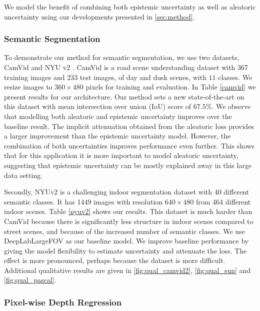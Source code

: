 We model the benefit of combining both epistemic uncertainty as well as aleatoric uncertainty using our developments presented in \cref{sec:method}. 

\subsubsection{Semantic Segmentation}

To demonstrate our method for semantic segmentation, we use two datasets, CamVid \citep{brostow2009semantic} and NYU v2 \citep{silberman2012indoor}. CamVid is a road scene understanding dataset with 367 training images and 233 test images, of day and dusk scenes, with $11$ classes. We resize images to $360\times480$ pixels for training and evaluation. In Table \ref{camvid} we present results for our architecture. Our method sets a new state-of-the-art on this dataset with mean intersection over union (IoU) score of $67.5\%$. We observe that modelling both aleatoric and epistemic uncertainty improves over the baseline result.  The implicit attenuation obtained from the aleatoric loss provides a larger improvement than the epistemic uncertainty model. However, the combination of both uncertainties improves performance even further. This shows that for this application it is more important to model aleatoric uncertainty, suggesting that epistemic uncertainty can be mostly explained away in this large data setting.

Secondly, NYUv2 \citep{silberman2012indoor} is a challenging indoor segmentation dataset with 40 different semantic classes. It has 1449 images with resolution $640\times480$ from 464 different indoor scenes. Table \ref{nyuv2} shows our results. This dataset is much harder than CamVid because there is significantly less structure in indoor scenes compared to street scenes, and because of the increased number of semantic classes. We use DeepLabLargeFOV \citep{chen2016deeplab} as our baseline model. We improve baseline performance by giving the model flexibility to estimate uncertainty and attenuate the loss. The effect is more pronounced, perhaps because the dataset is more difficult. Additional qualitative results are given in \cref{fig:qual_camvid2}, \cref{fig:qual_sun} and \cref{fig:qual_pascal}.



\subsubsection{Pixel-wise Depth Regression}

